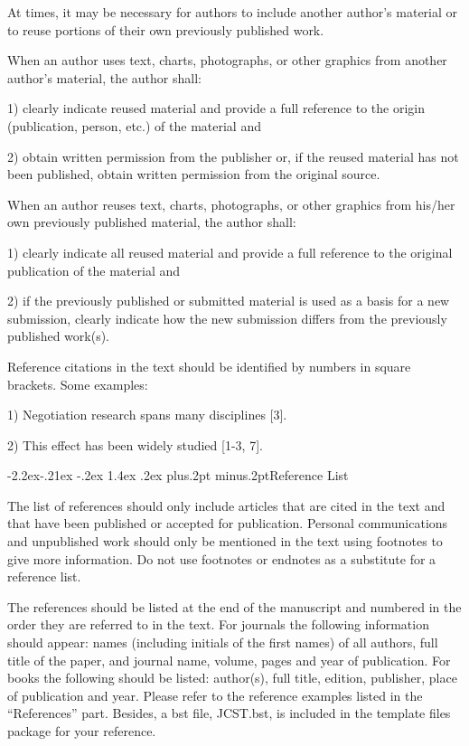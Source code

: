 \documentclass[twoside]{article}
\makeatletter
\def\subsubsection{\@startsection{subsubsection}{3}{\z@}%
 {-2.2ex\@plus -.21ex \@minus -.2ex}%
 {1.4ex \@plus.2ex}
{\normalfont\normalsize\protect\baselineskip=12pt plus.2pt minus.2pt\sl}}
\makeatother
\begin{document}
\begin{multicols}{2}
At times, it may be necessary for authors to include another author's material or to reuse portions of their own previously published work.

When an author uses text, charts, photographs, or other graphics from another author's material, the author shall:

1) clearly indicate reused material and provide a full reference to the origin (publication, person, etc.) of the material and

2) obtain written permission from the publisher or, if the reused material has not been published, obtain written permission from the original source.

When an author reuses text, charts, photographs, or other graphics from his/her own previously published material, the author shall:

1) clearly indicate all reused material and provide a full reference to the original publication of the material and

2) if the previously published or submitted material is used as a basis for a new submission, clearly indicate how the new submission differs from the previously published work(s).

Reference citations in the text should be identified by numbers in square
brackets. Some examples:

1) Negotiation research spans many disciplines [3].

2) This effect has been widely studied [1-3, 7].

\subsubsection{Reference List}

The list of references should only include articles that are cited in the text and that have been published or accepted for publication. Personal communications and unpublished work should only be mentioned in the text using footnotes to give more information. Do not use footnotes or endnotes as a substitute for a reference list.

The references should be listed at the end of the manuscript and numbered in the order they are referred to in the text. For journals the following information should appear: names (including initials of the first names) of all authors, full title of the paper, and journal name, volume, pages and year of publication. For books the following should be listed: author(s), full title, edition, publisher, place of publication and year. Please refer to the reference examples listed in the ``References'' part. Besides, a bst file, JCST.bst, is included in the template files package for your reference.


\end{multicols}
\end{document}
